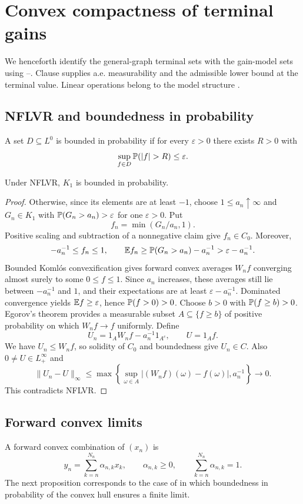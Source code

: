 \section{Convex compactness of terminal gains}
We henceforth identify the general-graph terminal sets with the gain-model sets using --.
Clause  supplies a.e. measurability and the admissible lower bound at the terminal value. Linear operations belong to the model structure .

\subsection{NFLVR and boundedness in probability}
A set $D\subseteq L^0$ is bounded in probability if for every $\varepsilon>0$
there exists $R>0$ with
\[
 \sup_{f\in D}\Pp(|f|>R)\leq\varepsilon.
\]
\begin{proposition}\label{prop:k1-bip}
Under NFLVR, $K_1$ is bounded in probability.
\end{proposition}
\begin{proof}
Otherwise, since its elements are at least $-1$, choose $1\leq a_n\uparrow\infty$
and $G_n\in K_1$ with $\mathbb P(G_n>a_n)>\varepsilon$ for one $\varepsilon>0$.
Put
\[
 f_n=\min(G_n/a_n,1).
\]
Positive scaling and subtraction of a nonnegative claim give $f_n\in C_0$.
Moreover,
\[
 -a_n^{-1}\leq f_n\leq1,\qquad
 \mathbb E f_n\geq\mathbb P(G_n>a_n)-a_n^{-1}>\varepsilon-a_n^{-1}.
\]
Bounded Komlós convexification gives forward convex averages $W_nf$
converging almost surely to some $0\leq f\leq1$. Since $a_n$ increases,
these averages still lie between $-a_n^{-1}$ and $1$, and their expectations
are at least $\varepsilon-a_n^{-1}$. Dominated convergence yields
$\mathbb E f\geq\varepsilon$, hence $\mathbb P(f>0)>0$.
Choose $b>0$ with $\mathbb P(f\geq b)>0$. Egorov's theorem provides a measurable
subset $A\subseteq\{f\geq b\}$ of positive probability on which $W_nf\to f$
uniformly. Define
\[
 U_n=1_AW_nf-a_n^{-1}1_{A^c},\qquad U=1_Af.
\]
We have $U_n\leq W_nf$, so solidity of $C_0$ and boundedness give $U_n\in C$.
Also $0\ne U\in L^\infty_+$ and
\[
 \|U_n-U\|_\infty
 \leq\max\left\{\sup_{\omega\in A}|(W_nf)(\omega)-f(\omega)|,a_n^{-1}\right\}
 \longrightarrow0.
\]
This contradicts NFLVR.
\end{proof}

\subsection{Forward convex limits}
A forward convex combination of $(x_n)$ is
\[
 y_n=\sum_{k=n}^{N_n}\alpha_{n,k}x_k,\qquad
 \alpha_{n,k}\geq0,\qquad\sum_{k=n}^{N_n}\alpha_{n,k}=1.
\]
The next proposition corresponds to the case of \cite[Lemma A1.1]{DS} in which boundedness in probability of the convex hull ensures a finite limit.

